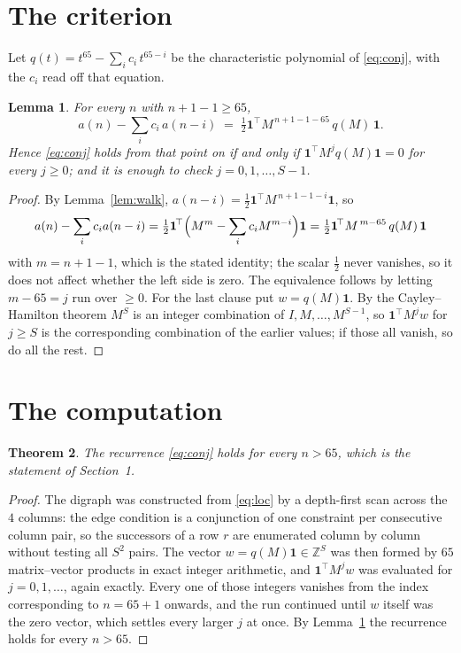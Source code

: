 \documentclass[11pt,a4paper]{article}
\theoremstyle{plain}
\newtheorem{theorem}{Theorem}
\newtheorem{lemma}[theorem]{Lemma}
\theoremstyle{definition}
\begin{document}
\section{The criterion}

Let $q(t)=t^{65}-\sum_i c_i\,t^{65-i}$ be the characteristic polynomial of
\eqref{eq:conj}, with the $c_i$ read off that equation.

\begin{lemma}\label{lem:crit}
For every $n$ with $n+1-1\ge65$,
\[
a(n)-\sum_i c_i\,a(n-i)\;=\;\tfrac1{2}\mathbf{1}^{\!\top}M^{\,n+1-1-65}\,q(M)\,\mathbf{1} .
\]
Hence \eqref{eq:conj} holds from that point on if and only if
$\mathbf{1}^{\!\top}M^{j}q(M)\mathbf{1}=0$ for every $j\ge0$; and it is enough to check
$j=0,1,\dots,S-1$.
\end{lemma}

\begin{proof}
By Lemma~\ref{lem:walk}, $a(n-i)=\tfrac1{2}\mathbf{1}^{\!\top}M^{\,n+1-1-i}\mathbf{1}$, so
\[
a(n)-\sum_i c_i a(n-i)
=\tfrac1{2}\mathbf{1}^{\!\top}\Bigl(M^{m}-\sum_i c_i M^{m-i}\Bigr)\mathbf{1}
=\tfrac1{2}\mathbf{1}^{\!\top}M^{\,m-65}\,q(M)\,\mathbf{1}
\]
with $m=n+1-1$, which is the stated identity; the scalar $\tfrac1{2}$ never vanishes, so
it does not affect whether the left side is zero. The equivalence follows by letting
$m-65=j$ run over $\ge0$. For the last clause put $w=q(M)\mathbf{1}$. By the
Cayley--Hamilton theorem $M^{S}$ is an integer combination of $I,M,\dots,M^{S-1}$, so
$\mathbf{1}^{\!\top}M^{j}w$ for $j\ge S$ is the corresponding combination of the earlier
values; if those all vanish, so do all the rest.
\end{proof}

\section{The computation}

\begin{theorem}
The recurrence \eqref{eq:conj} holds for every $n>65$, which is the statement of
Section~1.
\end{theorem}

\begin{proof}
The digraph was constructed from \eqref{eq:loc} by a depth-first scan across the $4$
columns: the edge condition is a conjunction of one constraint per consecutive column
pair, so the successors of a row $r$ are enumerated column by column without testing all
$S^2$ pairs. The vector $w=q(M)\mathbf{1}\in\mathbb{Z}^{S}$ was then formed by $65$
matrix--vector products in exact integer arithmetic, and $\mathbf{1}^{\!\top}M^{j}w$ was
evaluated for $j=0,1,\dots$, again exactly. Every one of those integers vanishes from the
index corresponding to $n=65+1$ onwards, and the run continued until $w$ itself was the
zero vector, which settles every larger $j$ at once. By Lemma~\ref{lem:crit} the recurrence
holds for every $n>65$.
\end{proof}
\end{document}
